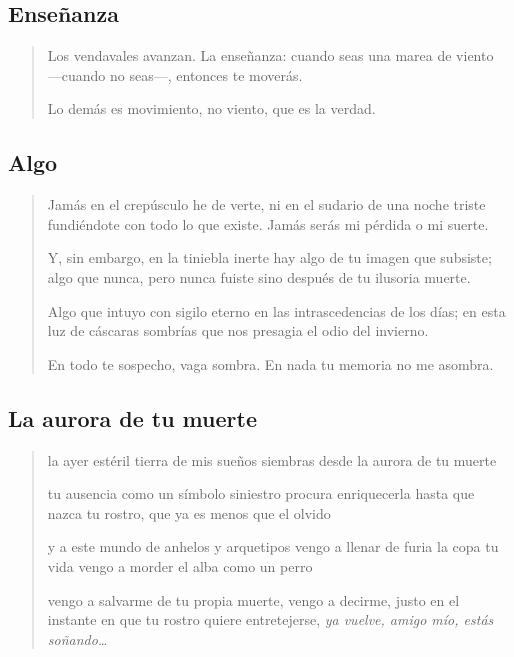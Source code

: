 \documentclass[a4paper, 12pt]{article}
\begin{document}
\subsection{Enseñanza}
\begin{verse}
Los vendavales avanzan.
La enseñanza:
cuando seas una marea
de viento —cuando no seas—,
entonces te moverás.

Lo demás es movimiento,
no viento, que es la verdad.
\end{verse}

\pagebreak
\subsection{Algo}

\begin{verse}
    
Jamás en el crepúsculo he de verte,
ni en el sudario de una noche triste
fundiéndote con todo lo que existe.
Jamás serás mi pérdida o mi suerte.
~ 

Y, sin embargo, en la tiniebla inerte
hay algo de tu imagen que subsiste;
algo que nunca, pero nunca fuiste 
sino después de tu ilusoria muerte.
~ 

Algo que intuyo con sigilo eterno
en las intrascedencias de los días;
en esta luz de cáscaras sombrías
que nos presagia el odio del invierno.
~ 

En todo te sospecho, vaga sombra.
En nada tu memoria no me asombra.


\end{verse}

\pagebreak
\subsection{La aurora de tu muerte}

\begin{verse}

la ayer estéril tierra de mis sueños 
siembras desde la aurora de tu muerte
~ 

tu ausencia como un símbolo siniestro
procura enriquecerla hasta que nazca 
tu rostro, que ya es menos que el olvido
~

y a este mundo de anhelos y arquetipos
vengo a llenar de furia la copa tu vida
vengo a morder el alba como un perro 
~ 

vengo a salvarme de tu propia muerte,
vengo a decirme, justo en el instante
en que tu rostro quiere entretejerse, 
\textit{ya vuelve, amigo mío, estás soñando\ldots}



\end{verse}
\end{document}
